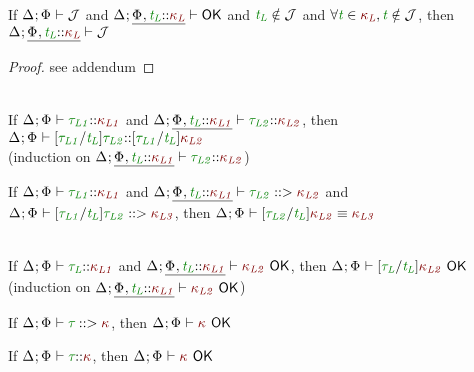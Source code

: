 \documentclass[11pt]{article}
\begin{document}
    \noindent\hrulefill
    \begin{lemma}[Weakening]
        \vphantom{.}\\
        If $\J$ and $\ContextWellFormed[\HoleCtx\xExtendTypVarCtx[][L][\knd[L]]]$ and $\typvar[L]\notin\mathcal{J}$ and $\forall\typvar\in\knd[L],\typvar\notin\mathcal{J}$, then $\J[\HoleCtx\xExtendTypVarCtx[][L][\knd[L]]]$
    \end{lemma}
    \begin{proof}
        see addendum
    \end{proof}
    \noindent\hrulefill
    \begin{lemma}[K-Substitution]
        \vphantom{.}\\
        If $\WellFormedAtKind{\typ[L1]}[\knd[L1]]$ and $\WellFormedAtKind[\HoleCtx\xExtendTypVarCtx[][L][{\knd[L1]}]]{\typ[L2]}[\knd[L2]]$, then $\WellFormedAtKind{\subst{\typ[L1]}{\typvar[L]}{\typ[L2]}}[\subst{\typ[L1]}{\typvar[L]}{\knd[L2]}]$ \\
        (induction on $\WellFormedAtKind[\HoleCtx\xExtendTypVarCtx[][L][{\knd[L1]}]]{\typ[L2]}[\knd[L2]]$)
    \end{lemma}
    \begin{lemma}[PK-Substitution]
        If $\WellFormedAtKind{\typ[L1]}[\knd[L1]]$ and $\PrincipalKind[\HoleCtx\xExtendTypVarCtx[][L][\knd[L1]]]{\typ[L2]}[\knd[L2]]$ and $\PrincipalKind{\subst{\typ[L1]}{\typvar[L]}{\typ[L2]}}[\knd[L3]]$, then $\KindEquiv{\subst{\typ[L2]}{\typvar[L]}{\knd[L2]}}{\knd[L3]}$
    \end{lemma}
    \begin{lemma}[OK-Substitution]
        \vphantom{.}\\
        If $\WellFormedAtKind{\typ[L]}[\knd[L1]]$ and $\KindWellFormed[{\knd[L2]}][\HoleCtx\xExtendTypVarCtx[][L][{\knd[L1]}]]$, then $\KindWellFormed[\subst{\typ[L]}{\typvar[L]}{\knd[L2]}]$ \\
        (induction on $\KindWellFormed[{\knd[L2]}][\HoleCtx\xExtendTypVarCtx[][L][{\knd[L1]}]]$)
    \end{lemma}
    \begin{theorem}[OK-PK]
        If $\PrincipalKind{\typ}$, then $\KindWellFormed$
    \end{theorem}
    \begin{theorem}[OK-WFaK]
        If $\WellFormedAtKind{\typ}$, then $\KindWellFormed$
    \end{theorem}
\end{document}
